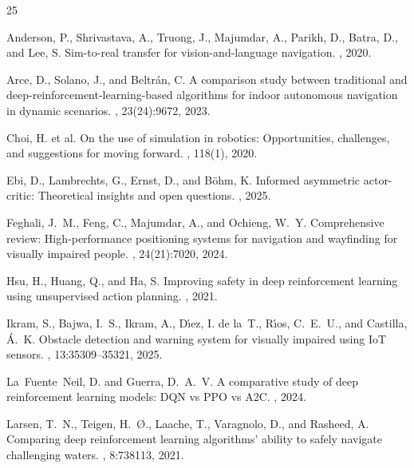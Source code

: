 \documentclass{article}
\begin{document}

\begin{thebibliography}{25}

Anderson, P., Shrivastava, A., Truong, J., Majumdar, A., Parikh, D., Batra, D.,
and Lee, S.
\newblock Sim-to-real transfer for vision-and-language navigation.
, 2020.

Arce, D., Solano, J., and Beltr{\'a}n, C.
\newblock A comparison study between traditional and deep-reinforcement-learning-based
algorithms for indoor autonomous navigation in dynamic scenarios.
, 23(24):9672, 2023.

Choi, H. et al.
\newblock On the use of simulation in robotics: Opportunities, challenges, and
suggestions for moving forward.
, 118(1), 2020.

Ebi, D., Lambrechts, G., Ernst, D., and B{\"o}hm, K.
\newblock Informed asymmetric actor-critic: Theoretical insights and open questions.
, 2025.

Feghali, J.~M., Feng, C., Majumdar, A., and Ochieng, W.~Y.
\newblock Comprehensive review: High-performance positioning systems for navigation
and wayfinding for visually impaired people.
, 24(21):7020, 2024.

Hsu, H., Huang, Q., and Ha, S.
\newblock Improving safety in deep reinforcement learning using unsupervised action
planning.
, 2021.

Ikram, S., Bajwa, I.~S., Ikram, A., D{\'\i}ez, I. de la~T., R{\'\i}os,
C.~E.~U., and Castilla, {\'A}.~K.
\newblock Obstacle detection and warning system for visually impaired using IoT
sensors.
, 13:35309--35321, 2025.

La~Fuente~Neil, D. and Guerra, D.~A.~V.
\newblock A comparative study of deep reinforcement learning models: DQN vs PPO vs A2C.
, 2024.

Larsen, T.~N., Teigen, H.~{\O}., Laache, T., Varagnolo, D., and Rasheed, A.
\newblock Comparing deep reinforcement learning algorithms' ability to safely navigate
challenging waters.
, 8:738113, 2021.


\end{thebibliography}
\end{document}
